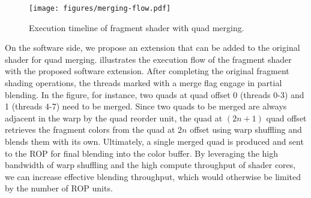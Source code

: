 \begin{figure}[t]
  \centering
  \texttt{[image: figures/merging-flow.pdf]}
  \caption{Execution timeline of fragment shader with quad merging.}
  \vspace{-0.15in}
  \label{fig:merging-flow}
\end{figure}

On the software side, we propose an extension that can be added to the original
shader for quad merging.
%
 illustrates the execution flow of the fragment shader
with the proposed software extension.
%
After completing the original fragment shading operations, the threads marked
with a merge flag engage in partial blending. 
%
In the figure, for instance, two quads at quad offset 0 (threads 0-3) and 1
(threads 4-7) need to be merged.
%
Since two quads to be merged are always adjacent in the warp by the quad
reorder unit, the quad at $(2n+1)$ quad offset retrieves the fragment colors
from the quad at $2n$ offset using warp shuffling and blends them with its own.
%
Ultimately, a single merged quad is produced and sent to the ROP for final
blending into the color buffer.
%
By leveraging the high bandwidth of warp shuffling and the high compute
throughput of shader cores, we can increase effective blending throughput,
which would otherwise be limited by the number of ROP units.
